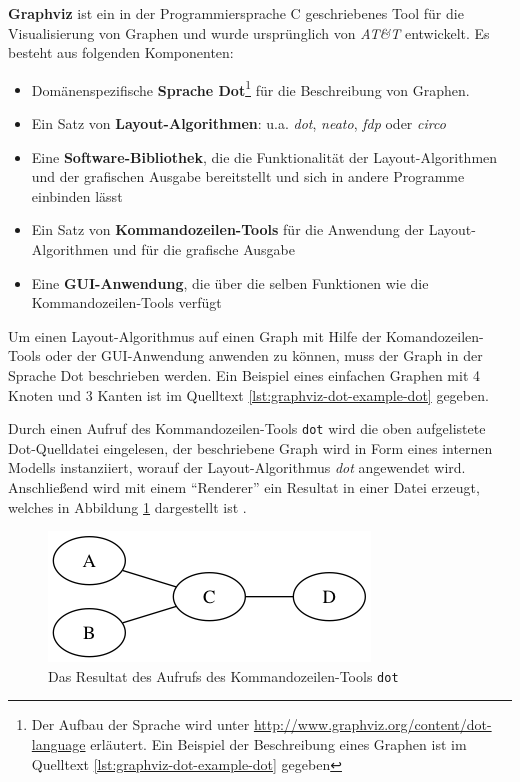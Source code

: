 \textbf{Graphviz} ist ein in der Programmiersprache C geschriebenes Tool für die Visualisierung von Graphen und wurde ursprünglich von \textit{AT\&T} entwickelt. Es besteht aus folgenden Komponenten:

\begin{itemize}
    \item Domänenspezifische \textbf{Sprache Dot}\footnote{Der Aufbau der Sprache wird unter \url{http://www.graphviz.org/content/dot-language} erläutert. Ein Beispiel der Beschreibung eines Graphen ist im Quelltext \ref{lst:graphviz-dot-example-dot} gegeben} für die Beschreibung von Graphen.
    \item Ein Satz von \textbf{Layout-Algorithmen}: u.a. \textit{dot}, \textit{neato}, \textit{fdp} oder \textit{circo} \cite{Gansner14Using, NorthGansner14Dot-Manual}
    \item Eine \textbf{Software-Bibliothek}, die die Funktionalität der Layout-Algorithmen und der grafischen Ausgabe bereitstellt und sich in andere Programme einbinden lässt \cite{Gansner14Using}
    \item Ein Satz von \textbf{Kommandozeilen-Tools} für die Anwendung der Layout-Algorithmen und für die grafische Ausgabe \cite{NorthGansner14Dot-Manual}
    \item Eine \textbf{GUI-Anwendung}, die über die selben Funktionen wie die Kommandozeilen-Tools verfügt
\end{itemize}

Um einen Layout-Algorithmus auf einen Graph mit Hilfe der Komandozeilen-Tools oder der GUI-Anwendung anwenden zu können, muss der Graph in der Sprache Dot beschrieben werden. Ein Beispiel eines einfachen Graphen mit 4 Knoten und 3 Kanten ist im Quelltext \ref{lst:graphviz-dot-example-dot} gegeben.



Durch einen Aufruf des Kommandozeilen-Tools \texttt{dot} wird die oben aufgelistete Dot-Quelldatei eingelesen, der beschriebene Graph wird in Form eines internen Modells instanziiert, worauf der Layout-Algorithmus \textit{dot} angewendet wird. Anschließend wird mit einem \enquote{Renderer} ein Resultat in einer Datei erzeugt, welches in Abbildung \ref{fig:graphviz-dot-example} dargestellt ist \cite{Gansner14Using}.

\begin{figure}[hbt]
    \centering
    \includegraphics[scale=0.75]{resources/graphviz-dot-example.png}
    \caption{Das Resultat des Aufrufs des Kommandozeilen-Tools \texttt{dot}}
    \label{fig:graphviz-dot-example}
\end{figure}


